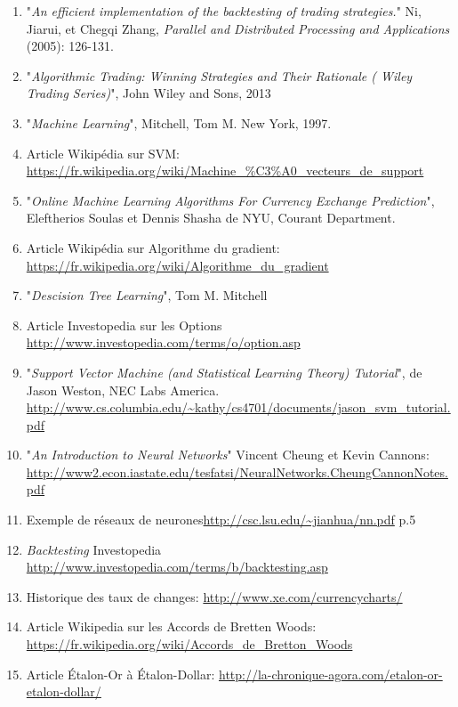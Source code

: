 \documentclass[a4paper, 11pt]{article}
\begin{document}
\begin{enumerate}
\item "\textit{An efficient implementation of the backtesting of trading strategies.}" Ni, Jiarui, et Chegqi Zhang, \textit{Parallel and Distributed Processing and Applications} (2005): 126-131.
\item "\textit{Algorithmic Trading: Winning Strategies and Their Rationale ( Wiley Trading Series)}", John Wiley and Sons, 2013
\item "\textit{Machine Learning}", Mitchell, Tom M. New York, 1997. \label{mitchell}
\item Article Wikipédia sur SVM: \url{https://fr.wikipedia.org/wiki/Machine_\%C3\%A0_vecteurs_de_support} \label{wikipedia svm}
\item "\textit{Online Machine Learning Algorithms For Currency Exchange Prediction}", Eleftherios Soulas et Dennis Shasha de NYU, Courant Department. \label{descente du gradient stochastique}
\item  Article Wikipédia sur Algorithme du gradient: \url{https://fr.wikipedia.org/wiki/Algorithme_du_gradient} \label{wikipedia descente du gradient}
\item "\textit{Descision Tree Learning}", Tom M. Mitchell \label{id3}
\item Article Investopedia sur les Options \url{http://www.investopedia.com/terms/o/option.asp}
\item "\textit{Support Vector Machine (and Statistical Learning Theory) Tutorial}", de Jason Weston, NEC Labs America. \url{http://www.cs.columbia.edu/~kathy/cs4701/documents/jason_svm_tutorial.pdf} \label{svm equation}
\item  "\textit{An Introduction to Neural Networks}" Vincent Cheung et Kevin Cannons: \url{http://www2.econ.iastate.edu/tesfatsi/NeuralNetworks.CheungCannonNotes.pdf}
\item Exemple de réseaux de neurones\url{http://csc.lsu.edu/~jianhua/nn.pdf} p.5
\item \textit{Backtesting} Investopedia \url{http://www.investopedia.com/terms/b/backtesting.asp} \label{backtesting investopedia}
\item Historique des taux de changes: \url{http://www.xe.com/currencycharts/} \label{historique taux de change}
\item Article Wikipedia sur les Accords de Bretten Woods: \url{https://fr.wikipedia.org/wiki/Accords_de_Bretton_Woods} \label{wikipedia bretten woods}
\item Article Étalon-Or à Étalon-Dollar: \url{http://la-chronique-agora.com/etalon-or-etalon-dollar/} \label{étalon-or à étalon-dollar}

\end{enumerate}
\end{document}
